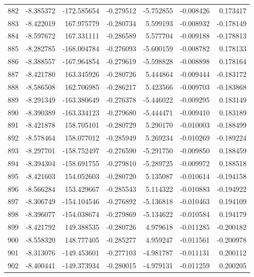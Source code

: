 \begin{tabular}{rrrrrrr}
 882 &  -8.385372 & -172.585654 & -0.279512 &  -5.752855 &  -0.008426 &  0.173417 \\
 883 &  -8.422019 &  167.975779 & -0.280734 &   5.599193 &  -0.008932 & -0.178149 \\
 884 &  -8.597672 &  167.331111 & -0.286589 &   5.577704 &  -0.009188 & -0.178813 \\
 885 &  -8.282785 & -168.004784 & -0.276093 &  -5.600159 &  -0.008782 &  0.178133 \\
 886 &  -8.388557 & -167.964854 & -0.279619 &  -5.598828 &  -0.008898 &  0.178164 \\
 887 &  -8.421780 &  163.345926 & -0.280726 &   5.444864 &  -0.009444 & -0.183172 \\
 888 &  -8.586508 &  162.706985 & -0.286217 &   5.423566 &  -0.009703 & -0.183868 \\
 889 &  -8.291349 & -163.380649 & -0.276378 &  -5.446022 &  -0.009295 &  0.183149 \\
 890 &  -8.390389 & -163.334123 & -0.279680 &  -5.444471 &  -0.009410 &  0.183189 \\
 891 &  -8.421878 &  158.705101 & -0.280729 &   5.290170 &  -0.010003 & -0.188499 \\
 892 &  -8.578464 &  158.077012 & -0.285949 &   5.269234 &  -0.010269 & -0.189224 \\
 893 &  -8.297701 & -158.752497 & -0.276590 &  -5.291750 &  -0.009850 &  0.188459 \\
 894 &  -8.394304 & -158.691755 & -0.279810 &  -5.289725 &  -0.009972 &  0.188518 \\
 895 &  -8.421603 &  154.052603 & -0.280720 &   5.135087 &  -0.010614 & -0.194158 \\
 896 &  -8.566284 &  153.429667 & -0.285543 &   5.114322 &  -0.010883 & -0.194922 \\
 897 &  -8.306749 & -154.104546 & -0.276892 &  -5.136818 &  -0.010463 &  0.194109 \\
 898 &  -8.396077 & -154.038674 & -0.279869 &  -5.134622 &  -0.010584 &  0.194179 \\
 899 &  -8.421792 &  149.388535 & -0.280726 &   4.979618 &  -0.011285 & -0.200182 \\
 900 &  -8.558320 &  148.777405 & -0.285277 &   4.959247 &  -0.011561 & -0.200978 \\
 901 &  -8.313076 & -149.453601 & -0.277103 &  -4.981787 &  -0.011131 &  0.200112 \\
 902 &  -8.400441 & -149.373934 & -0.280015 &  -4.979131 &  -0.011259 &  0.200205 \\

\end{tabular}
